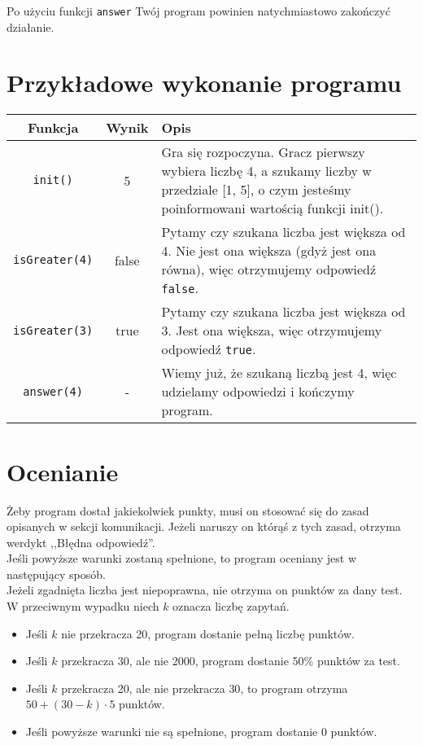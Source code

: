 \documentclass{spiral}
\begin{document}
    Po użyciu funkcji \texttt{answer} Twój program powinien
    natychmiastowo zakończyć działanie.

\section{Przykładowe wykonanie programu}
    \begin{tabular}{|c|c|p{12.5cm}|}
        \hline

        \textbf{Funkcja} & \textbf{Wynik} & \textbf{Opis} \\ \hline

        \texttt{init()} & 5 &
        Gra się rozpoczyna. Gracz pierwszy wybiera liczbę 4,
        a szukamy liczby w przedziale [1, 5], o czym jesteśmy poinformowani
        wartością funkcji init().
        \\ \hline

        \texttt{isGreater(4)} & false &
        Pytamy czy szukana liczba jest większa od 4.
        Nie jest ona większa (gdyż jest ona równa),
        więc otrzymujemy odpowiedź \texttt{false}. 
        \\ \hline

        \texttt{isGreater(3)} & true &
        Pytamy czy szukana liczba jest większa od 3.
        Jest ona większa, więc otrzymujemy odpowiedź \texttt{true}. 
        \\ \hline

        \texttt{answer(4)} & - &
        Wiemy już, że szukaną liczbą jest 4,
        więc udzielamy odpowiedzi i kończymy program.
        \\ \hline
    \end{tabular}

\section{Ocenianie}
    Żeby program dostał jakiekolwiek punkty,
    musi on stosować się do zasad opisanych w sekcji komunikacji.
    Jeżeli naruszy on którąś z tych zasad, otrzyma werdykt ,,Błędna odpowiedź''.\\
    Jeśli powyższe warunki zostaną spełnione,
    to program oceniany jest w następujący sposób.\\
    Jeżeli zgadnięta liczba jest niepoprawna,
    nie otrzyma on punktów za dany test.\\
    W przeciwnym wypadku niech $k$ oznacza liczbę zapytań.
    \begin{itemize}
        \item Jeśli $k$ nie przekracza 20, program dostanie pełną liczbę punktów.
        \item Jeśli $k$ przekracza 30, ale nie 2000,
            program dostanie 50\% punktów za test.
        \item Jeśli $k$ przekracza 20, ale nie przekracza $30$, to program otrzyma
            $50 + (30 - k) \cdot 5$ punktów.
        \item Jeśli powyższe warunki nie są spełnione, program dostanie 0 punktów.
    \end{itemize}
\end{document}
